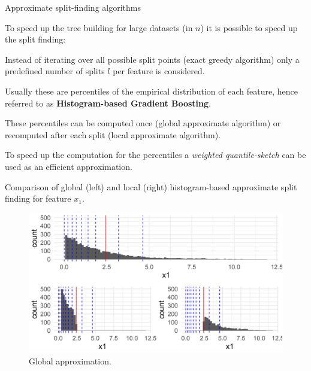 \begin{vbframe}{Approximate split-finding algorithms}

To speed up the tree building for large datasets (in $n$) it is possible to speed up the split finding:

\lz

Instead of iterating over all possible split points (exact greedy algorithm) only a predefined number of splits $l$ per feature is considered.

\lz

Usually these are percentiles of the empirical distribution of each feature, hence referred to as \textbf{Histogram-based Gradient Boosting}.

\lz

These percentiles can be computed once (global approximate algorithm) or recomputed after each split (local approximate algorithm).

\lz

To speed up the computation for the percentiles a \emph{weighted quantile-sketch} can be used as an efficient approximation.


\framebreak

Comparison of global (left) and local (right) histogram-based approximate split finding for feature $x_1$.

\lz

\begin{small}
\begin{minipage}[b]{0.49\textwidth}
\begin{figure}
  \includegraphics[width=\textwidth]{figure_man/split-finding01.png}
  \caption*{Global approximation.}
\end{figure}


\end{minipage}
\end{small}
\end{vbframe}
